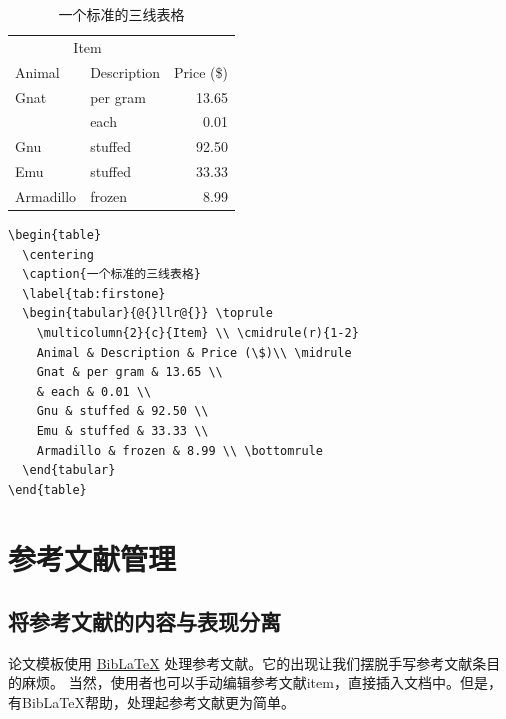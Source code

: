 \begin{table}
  \centering
  \caption{一个标准的三线表格}
  \label{tab:firstone}
  \begin{tabular}{@{}llr@{}} \toprule
    \multicolumn{2}{c}{Item} \\ \cmidrule(r){1-2}
    Animal & Description & Price (\$)\\ \midrule
    Gnat & per gram & 13.65 \\
    & each & 0.01 \\
    Gnu & stuffed & 92.50 \\
    Emu & stuffed & 33.33 \\
    Armadillo & frozen & 8.99 \\ \bottomrule
  \end{tabular}
\end{table}

\begin{lstlisting}[language={[LaTeX]TeX}, caption={三线表格}, label=demo-table3]
\begin{table}
  \centering
  \caption{一个标准的三线表格}
  \label{tab:firstone}
  \begin{tabular}{@{}llr@{}} \toprule
    \multicolumn{2}{c}{Item} \\ \cmidrule(r){1-2}
    Animal & Description & Price (\$)\\ \midrule
    Gnat & per gram & 13.65 \\
    & each & 0.01 \\
    Gnu & stuffed & 92.50 \\
    Emu & stuffed & 33.33 \\
    Armadillo & frozen & 8.99 \\ \bottomrule
  \end{tabular}
\end{table}
\end{lstlisting}


\section{参考文献管理}
\label{sec:reference}
\subsection{将参考文献的内容与表现分离}

\BIThesis{}论文模板使用 \href{https://www.ctan.org/pkg/biblatex}{BibLaTeX} 处理参考文献。它的出现让我们摆脱手写参考文献条目
的麻烦。
当然，使用者也可以手动编辑参考文献item，直接插入文档中。但是，有BibLaTeX帮助，处理起参考文献更为简单。

